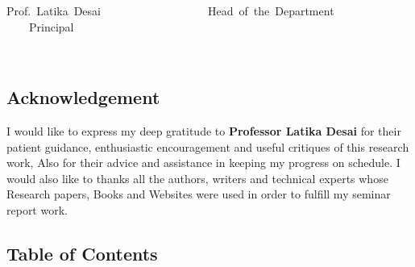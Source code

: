 \documentclass[12pt]{article}
\begin{document}
\vspace{\baselineskip}

\vspace{\baselineskip}



\begin{FlushLeft}
Prof.\ Latika\ Desai\ \ \ \ \ \ \ \ \ \ \ \ \ \ \ \ \ \  \ Head\ of\ the\ Department\ \ \ \ \ \ \ \ \ \ \ \ \ \ \ \ \ Principal  
\end{FlushLeft}\par

\begin{FlushLeft}
\ \ \ \ \ \ \ \ \ \ \ \ \ \ \  
\end{FlushLeft}\par




\newpage
\thispagestyle{empty}
\vspace{\baselineskip}\begin{Center}
\section*{Acknowledgement}
\end{Center}


\vspace{\baselineskip}
{\fontsize{14pt}{16.8pt}\selectfont I would like to express my deep gratitude to \textbf{Professor Latika Desai} for their patient guidance, enthusiastic encouragement and useful critiques of this research work, Also for their advice and assistance in keeping my progress on schedule. I would also like to thanks all the authors, writers and technical experts whose Research papers, Books and Websites were used in order to fulfill my seminar report work.\par}\par




\newpage

\vspace{\baselineskip}\begin{Center}
\section*{Table of Contents}
\end{Center}
\end{document}
